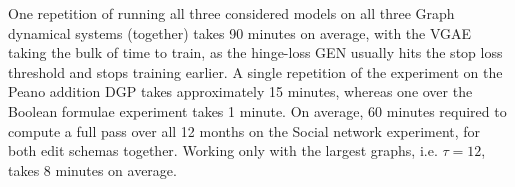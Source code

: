 One repetition of running all three considered models on all three Graph dynamical systems (together) takes 90 minutes on average, with the VGAE taking the bulk of time to train, as the hinge-loss GEN usually hits the stop loss threshold and stops training earlier. A single repetition of the experiment on the Peano addition DGP takes approximately 15 minutes, whereas one over the Boolean formulae experiment takes 1 minute. On average, 60 minutes required to compute a full pass over all 12 months on the Social network experiment, for both edit schemas together. Working only with the largest graphs, i.e. $\tau=12$, takes 8 minutes on average.



